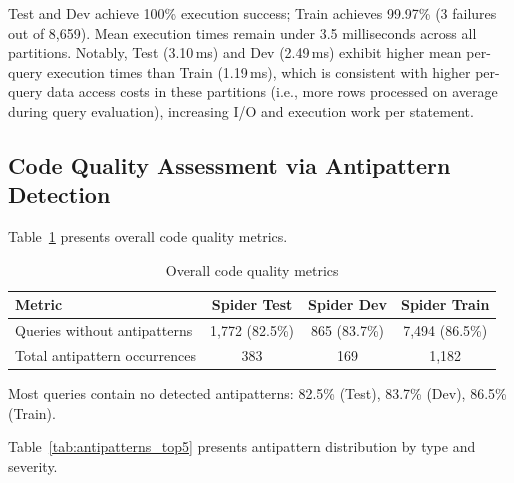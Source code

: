 \documentclass[print]{einformatica}
\begin{document}
Test and Dev achieve 100\% execution success; Train achieves 99.97\% (3 failures out of 8,659). Mean execution times remain under 3.5 milliseconds across all partitions. Notably, Test (3.10\,ms) and Dev (2.49\,ms) exhibit higher mean per-query execution times than Train (1.19\,ms), which is consistent with higher per-query data access costs in these partitions (i.e., more rows processed on average during query evaluation), increasing I/O and execution work per statement.

\FloatBarrier
\subsection{Code Quality Assessment via Antipattern Detection}\label{sec:antipattern_results}

Table~\ref{tab:antipatterns_overall} presents overall code quality metrics.

\begin{table}[ht]
    \caption{Overall code quality metrics}
    \label{tab:antipatterns_overall}
    \centering
    \footnotesize
    \begin{tabular}{lccc}
        \toprule
        \textbf{Metric} & \textbf{Spider Test} & \textbf{Spider Dev} & \textbf{Spider Train} \\
        \midrule
        Queries without antipatterns & 1,772 (82.5\%) & 865 (83.7\%) & 7,494 (86.5\%) \\
        Total antipattern occurrences & 383 & 169 & 1,182 \\
        \bottomrule
    \end{tabular}
\end{table}

Most queries contain no detected antipatterns: 82.5\% (Test), 83.7\% (Dev), 86.5\% (Train).

Table~\ref{tab:antipatterns_top5} presents antipattern distribution by type and severity.
\end{document}
